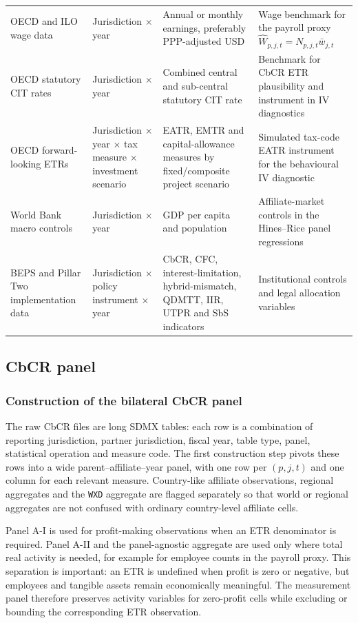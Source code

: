 \documentclass[11pt,a4paper]{article}
\newcommand{\code}[1]{\texttt{#1}}
\begin{document}
\begin{table}[H]
\begin{tabularx}{\textwidth}{@{}L{2.8cm}L{3.2cm}L{3.2cm}X@{}}
OECD and ILO wage data & Jurisdiction $\times$ year & Annual or monthly earnings, preferably PPP-adjusted USD & Wage benchmark for the payroll proxy $\hat{W}_{p,j,t}=N_{p,j,t}\bar{w}_{j,t}$ \\
OECD statutory CIT rates & Jurisdiction $\times$ year & Combined central and sub-central statutory CIT rate & Benchmark for CbCR ETR plausibility and instrument in IV diagnostics \\
OECD forward-looking ETRs & Jurisdiction $\times$ year $\times$ tax measure $\times$ investment scenario & EATR, EMTR and capital-allowance measures by fixed/composite project scenario & Simulated tax-code EATR instrument for the behavioural IV diagnostic \\
World Bank macro controls & Jurisdiction $\times$ year & GDP per capita and population & Affiliate-market controls in the Hines--Rice panel regressions \\
BEPS and Pillar Two implementation data & Jurisdiction $\times$ policy instrument $\times$ year & CbCR, CFC, interest-limitation, hybrid-mismatch, QDMTT, IIR, UTPR and SbS indicators & Institutional controls and legal allocation variables \\
\bottomrule
\end{tabularx}
\end{table}

\subsection{CbCR panel}\label{app:CbCR}

\subsubsection{Construction of the bilateral CbCR panel}\label{sec:bilateral_panel}

The raw CbCR files are long SDMX tables: each row is a combination of reporting jurisdiction, partner jurisdiction, fiscal year, table type, panel, statistical operation and measure code. The first construction step pivots these rows into a wide parent--affiliate--year panel, with one row per $(p,j,t)$ and one column for each relevant measure. Country-like affiliate observations, regional aggregates and the \code{WXD} aggregate are flagged separately so that world or regional aggregates are not confused with ordinary country-level affiliate cells.

Panel A-I is used for profit-making observations when an ETR denominator is required. Panel A-II and the panel-agnostic aggregate are used only where total real activity is needed, for example for employee counts in the payroll proxy. This separation is important: an ETR is undefined when profit is zero or negative, but employees and tangible assets remain economically meaningful. The measurement panel therefore preserves activity variables for zero-profit cells while excluding or bounding the corresponding ETR observation. 
\end{document}
